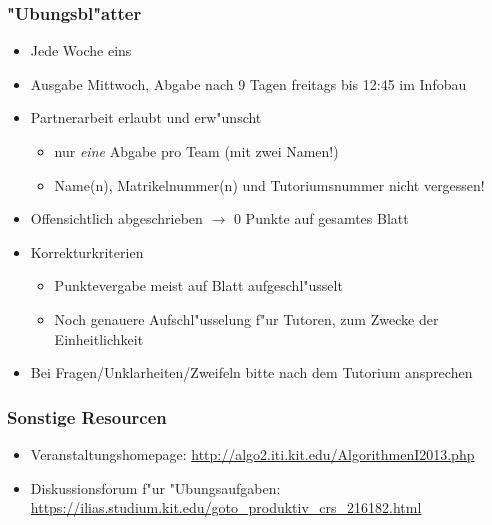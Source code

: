 \documentclass[t]{beamer}
\begin{document}
\begin{frame}
  \frametitle{"Ubungsbl"atter}
  \begin{itemize}

  \item Jede Woche eins
  \item Ausgabe Mittwoch, Abgabe nach 9 Tagen freitags bis 12:45 im Infobau
  \item Partnerarbeit erlaubt und erw"unscht
    \begin{itemize}
    \item nur \emph{eine} Abgabe pro Team (mit zwei Namen!)
    \item Name(n), Matrikelnummer(n) und Tutoriumsnummer nicht vergessen!
    \end{itemize}
  \item Offensichtlich abgeschrieben $\rightarrow$ 0 Punkte auf gesamtes Blatt
  \item Korrekturkriterien
    \begin{itemize}
    \item Punktevergabe meist auf Blatt aufgeschl"usselt
    \item Noch genauere Aufschl"usselung f"ur Tutoren, zum Zwecke der Einheitlichkeit
    \end{itemize}
  \item Bei Fragen/Unklarheiten/Zweifeln bitte nach dem Tutorium ansprechen

  \end{itemize}
\end{frame}

\begin{frame}
  \frametitle{Sonstige Resourcen}
  \begin{itemize}
  \item Veranstaltungshomepage: \url{http://algo2.iti.kit.edu/AlgorithmenI2013.php}
  \item Diskussionsforum f"ur "Ubungsaufgaben:
     \small \url{https://ilias.studium.kit.edu/goto_produktiv_crs_216182.html}
  \end{itemize}
\end{frame}
\end{document}

